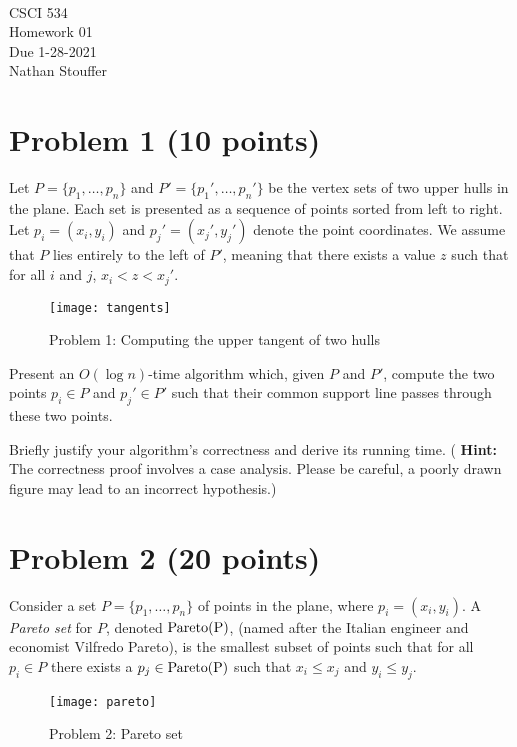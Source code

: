 \documentclass[11pt]{article}
\newcommand{\course}{CSCI 534}
\newcommand{\proj}{Homework 01}
\newcommand{\dueDate}{1-28-2021}
\newcommand{\name}{Nathan Stouffer}
\newcommand{\pareto}[1]{\rm{Pareto}(#1)}
\begin{document}
{ ~\\
    \course \\
    \proj \\
    Due \dueDate \\
    \name
}

\section*{Problem 1 (10 points)}

Let $P = \{ p_1, \ldots, p_n \}$ and $P' = \{ p_1', \ldots, p_n' \}$ be the
vertex sets of two upper hulls in the plane.  Each set is presented as a
sequence of points sorted from left to right.  Let $p_i = (x_i, y_i)$ and $p_j'
= (x_j', y_j')$ denote the point coordinates.  We assume that $P$ lies entirely
to the left of $P'$, meaning that there exists a value $z$ such that for all
$i$ and $j$, $x_i < z < x_j'$.

\begin{figure}[h]
    \centering
    \texttt{[image: tangents]}
    \caption{Problem 1: Computing the upper tangent of two hulls}
\end{figure}

Present an $O(\log n)$-time algorithm which, given $P$ and $P'$, compute the two
points $p_i \in P$ and $p_j' \in P'$ such that their common support line passes
through these two points.

Briefly justify your algorithm's correctness and derive its running time.  ({\bf
Hint:} The correctness proof involves a case analysis.  Please be careful, a
poorly drawn figure may lead to an incorrect hypothesis.)

\section*{Problem 2 (20 points)}

Consider a set $P = \{p_1, \ldots, p_n \}$ of points in the plane, where $p_i =
(x_i, y_i)$. A \emph{Pareto set} for $P$, denoted $\pareto{P}$, (named after
the Italian engineer and economist Vilfredo Pareto), is the smallest subset of points
such that for all $p_i \in P$ there exists a $p_j \in \pareto{P}$ such that $x_i \leq x_j$ and
$y_i \leq y_j$.

\begin{figure}[h]
    \centering
    \texttt{[image: pareto]}
    \caption{Problem 2: Pareto set}
\end{figure}
\end{document}
